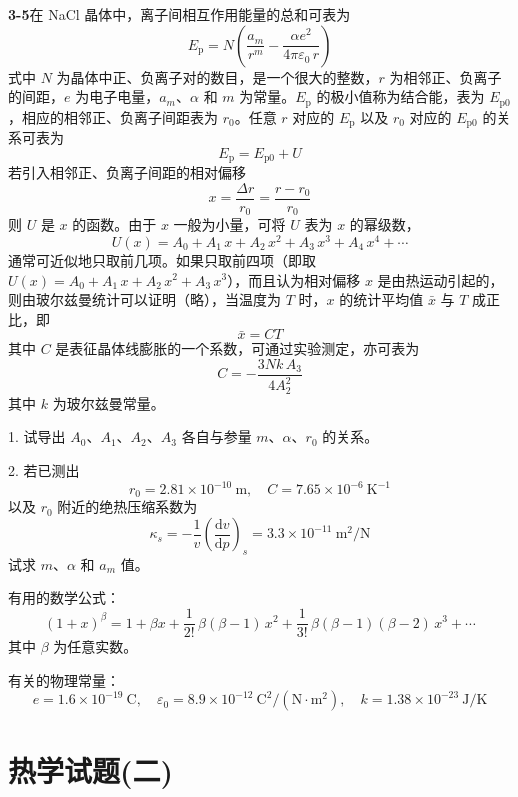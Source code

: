 \newpage
\textbf{3-5}\quad 在 NaCl 晶体中，离子间相互作用能量的总和可表为
$$
E_{\mathrm{p}} = N\left(\frac{a_{m}}{r^{m}} - \frac{\alpha e^{2}}{4\pi\varepsilon_{0}\, r}\right)
$$
式中 $N$ 为晶体中正、负离子对的数目，是一个很大的整数，$r$ 为相邻正、负离子的间距，$e$ 为电子电量，$a_{m}$、$\alpha$ 和 $m$ 为常量。$E_{\mathrm{p}}$ 的极小值称为结合能，表为 $E_{\mathrm{p}0}$，相应的相邻正、负离子间距表为 $r_{0}$。任意 $r$ 对应的 $E_{\mathrm{p}}$ 以及 $r_{0}$ 对应的 $E_{\mathrm{p}0}$ 的关系可表为
$$
E_{\mathrm{p}} = E_{\mathrm{p}0} + U
$$
若引入相邻正、负离子间距的相对偏移
$$
x = \frac{\Delta r}{r_{0}} = \frac{r - r_{0}}{r_{0}}
$$
则 $U$ 是 $x$ 的函数。由于 $x$ 一般为小量，可将 $U$ 表为 $x$ 的幂级数，
$$
U(x) = A_{0} + A_{1}\,x + A_{2}\,x^{2} + A_{3}\,x^{3} + A_{4}\,x^{4} + \cdots
$$
通常可近似地只取前几项。如果只取前四项（即取 $U(x) = A_{0} + A_{1}\,x + A_{2}\,x^{2} + A_{3}\,x^{3}$），而且认为相对偏移 $x$ 是由热运动引起的，则由玻尔兹曼统计可以证明（略），当温度为 $T$ 时，$x$ 的统计平均值 $\bar{x}$ 与 $T$ 成正比，即
$$
\bar{x} = CT
$$
其中 $C$ 是表征晶体线膨胀的一个系数，可通过实验测定，亦可表为
$$
C = -\frac{3Nk\,A_{3}}{4A_{2}^{2}}
$$
其中 $k$ 为玻尔兹曼常量。

1. 试导出 $A_{0}$、$A_{1}$、$A_{2}$、$A_{3}$ 各自与参量 $m$、$\alpha$、$r_{0}$ 的关系。

2. 若已测出
$$
r_{0} = 2.81 \times 10^{-10}\ \mathrm{m},\quad C = 7.65 \times 10^{-6}\ \mathrm{K}^{-1}
$$
以及 $r_{0}$ 附近的绝热压缩系数为
$$
\kappa_{s} = -\frac{1}{v}\left(\frac{\mathrm{d}v}{\mathrm{d}p}\right)_{s} = 3.3 \times 10^{-11}\ \mathrm{m}^{2}/\mathrm{N}
$$
试求 $m$、$\alpha$ 和 $a_{m}$ 值。

有用的数学公式：
$$
(1 + x)^{\beta} = 1 + \beta x + \frac{1}{2!}\,\beta(\beta - 1)\,x^{2} + \frac{1}{3!}\,\beta(\beta - 1)(\beta - 2)\,x^{3} + \cdots
$$
其中 $\beta$ 为任意实数。

有关的物理常量：
$$
e = 1.6 \times 10^{-19}\ \mathrm{C},\quad \varepsilon_{0} = 8.9 \times 10^{-12}\ \mathrm{C}^{2}/(\mathrm{N}\cdot\mathrm{m}^{2}),\quad k = 1.38 \times 10^{-23}\ \mathrm{J/K}
$$

\vfill


\section*{热学试题(二)}
\vfill

